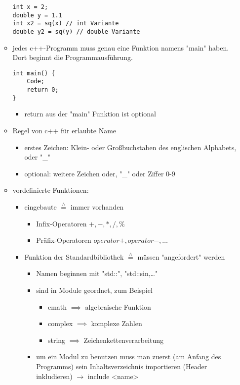 \documentclass[a4paper]{scrartcl}
\newcommand{\estimates}{\overset{\scriptscriptstyle\wedge}{=}}%
\theoremstyle{definition}
\theoremstyle{plain}
\theoremstyle{remark}
\theoremstyle{remark}
\begin{document}
\begin{itemize}
\begin{itemize}
\begin{verbatim}
int x = 2;
double y = 1.1
int x2 = sq(x) // int Variante
double y2 = sq(y) // double Variante
\end{verbatim}
\item jedes c++-Programm muss genau eine Funktion namens "main" haben. Dort beginnt die Programmausführung.
\begin{verbatim}
int main() {
	Code;
	return 0;
}
\end{verbatim}
\begin{itemize}
\item return aus der "main" Funktion ist optional
\end{itemize}
\item Regel von c++ für erlaubte Name
\begin{itemize}
\item erstes Zeichen: Klein- oder Großbuchstaben des englischen Alphabets, oder "\_"
\item optional: weitere Zeichen oder, "\_" oder Ziffer 0-9
\end{itemize}
\item vordefinierte Funktionen:
\begin{itemize}
\item eingebaute $\estimates$ immer vorhanden
\begin{itemize}
\item Infix-Operatoren $+,-,*,/,\%$
\item Präfix-Operatoren $operator+,operator-,\ldots$
\end{itemize}
\item Funktion der Standardbibliothek $\estimates$ müssen "angefordert" werden
\begin{itemize}
\item Namen beginnen mit "std::", "std::sin,\ldots{}"
\item sind in Module geordnet, zum Beispiel
\begin{itemize}
\item cmath $\implies$ algebraische Funktion
\item complex $\implies$ komplexe Zahlen
\item string $\implies$ Zeichenkettenverarbeitung
\end{itemize}
\item um ein Modul zu benutzen muss man zuerst (am Anfang des Programms) sein Inhaltsverzeichnis importieren (Header inkludieren) $\rightarrow$ include <name>
\begin{verbatim}

\end{verbatim}
\end{itemize}
\end{itemize}
\end{itemize}
\end{itemize}
\end{document}
